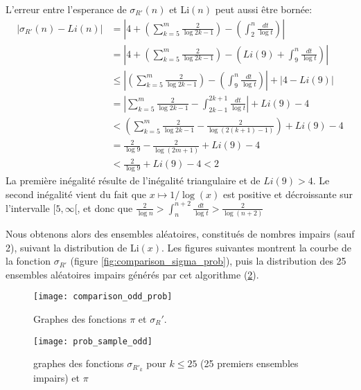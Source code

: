 \documentclass[../main.tex]{report}
\begin{document}
L'erreur entre l'esperance de $\sigma_{R'}(n)$ et Li$(n)$ peut aussi être bornée:
\[ \begin{aligned}
\left| \sigma_{R'}(n) - Li(n) \right|
&= \left| 4 + \left(\sum_{k=5}^m \frac{2}{\log 2k-1}\right)
		- \left(\int_2^n \frac{dt}{\log t} \right) \right| \\
&= \left| 4 + \left(\sum_{k=5}^m \frac{2}{\log 2k-1}\right)
		- \left(Li(9) + \int_9^n \frac{dt}{\log t} \right) \right| \\
&\leq \left| \left(\sum_{k=5}^m \frac{2}{\log 2k-1}\right)
		- \left(\int_9^n \frac{dt}{\log t} \right) \right| + \left| 4 - Li(9)\right| \\
&= \left| \sum_{k=5}^m \frac{2}{\log 2k - 1} - 
		\int_{2k-1}^{2k+1} \frac{dt}{\log t} \right| + Li(9) - 4 \\ 
&< \left(\sum_{k=5}^m \frac{2}{\log 2k-1} - \frac{2}{\log{(2(k+1)-1)}}\right)
		+ Li(9) - 4 \\
&= \frac{2}{\log 9} - \frac{2}{\log (2m + 1)} + Li(9) - 4 \\
&< \frac{2}{\log 9} + Li(9) - 4	< 2		
\end{aligned} \]
La première inégalité résulte de l'inégalité triangulaire et de $Li(9) > 4$. Le second inégalité vient du fait que $x \mapsto 1/\log(x)$ est positive et décroissante sur l'intervalle $[5,\infty[$, 
et donc que $\frac{2}{\log n} > \int_n^{n+2}\frac{dt}{\log t} > \frac{2}{\log (n+2)}$

Nous obtenons alors des ensembles aléatoires, constitués de nombres impairs (sauf 2), suivant la distribution de Li$(x)$. 
Les figures suivantes montrent la courbe de la fonction $\sigma_{R'}$ (figure \ref{fig:comparison_sigma_prob}), puis la distribution des 25 ensembles aléatoires impairs générés par cet algorithme (\ref{fig:prob_sample_odd}).

\begin{figure}[H]
\centering
\texttt{[image: comparison\_odd\_prob]}
\caption{Graphes des fonctions $\pi$ et $\sigma_R'$.}
\label{fig:comparison_odd_prob}
\end{figure}

\begin{figure}[H]
	\centering
	\texttt{[image: prob\_sample\_odd]}
	\caption{graphes des fonctions $\sigma_{R'_k}$ pour $k \leq 25$ (25 premiers ensembles impairs) et $\pi$}
	\label{fig:prob_sample_odd}
\end{figure}
\end{document}
